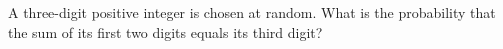 A three-digit positive integer is chosen at random. What is the probability that the sum of its first two digits equals its third digit?
